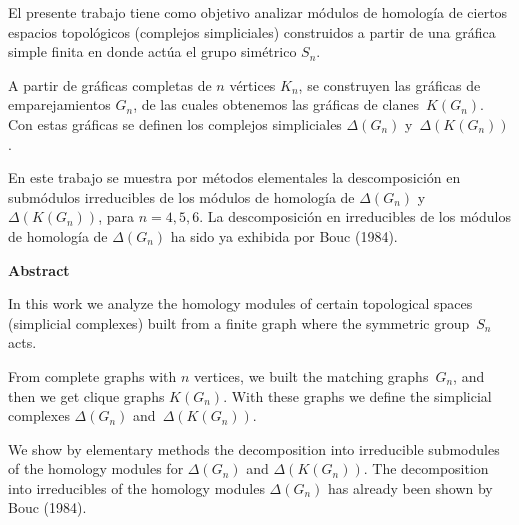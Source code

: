 \documentclass[12pt]{book}
\theoremstyle{definition}
\newcounter{in}
\newcounter{ini}
\begin{document}
El presente trabajo tiene como objetivo analizar módulos de homología
de ciertos espacios topológicos (complejos simpliciales) construidos a partir de una gráfica
simple finita en donde actúa el grupo simétrico $S_{n}$.

A partir de gráficas completas de $n$ vértices $K_{n}$, se construyen
las gráficas de emparejamientos $G_{n}$, de las cuales obtenemos las
gráficas de clanes~$K(G_{n})$. Con estas gráficas se definen los
complejos simpliciales $\Delta(G_{n})$ y~$\Delta(K(G_{n}))$. 

En este trabajo se muestra por métodos elementales la descomposición en submódulos irreducibles
de los módulos de homología de $\Delta(G_{n})$ y $\Delta(K(G_{n}))$,
para $n=4,5,6$. La descomposición en irreducibles de los
 módulos de homología de $\Delta(G_{n})$ ha sido ya exhibida
por Bouc (1984).


\vspace{2cm}

\begin{flushleft}
  {\bfseries\Large Abstract}
\end{flushleft}

In this work we analyze the homology modules
of certain topological spaces (simplicial complexes)  built from a
finite graph where the symmetric group~$S_{n}$ acts. 

From complete graphs with $n$ vertices, we built the matching
graphs~$G_{n}$, and then we get clique graphs $K(G_{n})$. With these
graphs we define the simplicial complexes $\Delta(G_{n})$
and~$\Delta(K(G_{n}))$. 

We show by elementary methods the decomposition into
irreducible submodules of the homology modules for $\Delta(G_{n})$ and
$\Delta(K(G_{n}))$. The decomposition into irreducibles of the homology
modules $\Delta (G_{n}) $ has already been shown by Bouc (1984).
\end{document}

